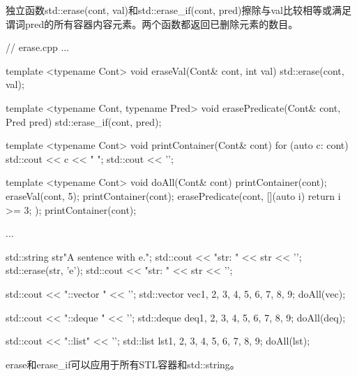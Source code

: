 独立函数std::erase(cont, val)和std::erase\_if(cont, pred)擦除与val比较相等或满足谓词pred的所有容器内容元素。两个函数都返回已删除元素的数目。


\begin{cpp}
// erase.cpp
...

template <typename Cont>
void eraseVal(Cont& cont, int val) {
	std::erase(cont, val);
}

template <typename Cont, typename Pred>
void erasePredicate(Cont& cont, Pred pred) {
	std::erase_if(cont, pred);
}

template <typename Cont>
void printContainer(Cont& cont) {
	for (auto c: cont) std::cout << c << " ";
	std::cout << '\n';
}

template <typename Cont>
void doAll(Cont& cont) {
	printContainer(cont);
	eraseVal(cont, 5);
	printContainer(cont);
	erasePredicate(cont, [](auto i) { return i >= 3; } );
	printContainer(cont);
}

...

std::string str{"A sentence with e."};
std::cout << "str: " << str << '\n';
std::erase(str, 'e');
std::cout << "str: " << str << '\n';

std::cout << "\nstd::vector " << '\n';
std::vector vec{1, 2, 3, 4, 5, 6, 7, 8, 9};
doAll(vec);

std::cout << "\nstd::deque " << '\n';
std::deque deq{1, 2, 3, 4, 5, 6, 7, 8, 9};
doAll(deq);

std::cout << "\nstd::list" << '\n';
std::list lst{1, 2, 3, 4, 5, 6, 7, 8, 9};
doAll(lst);
\end{cpp}

erase和erase\_if可以应用于所有STL容器和std::string。


